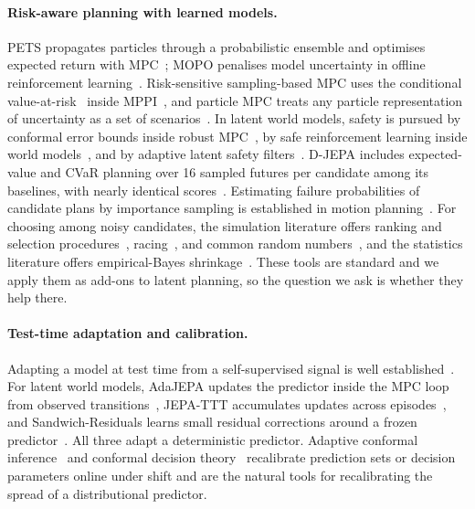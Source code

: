 \paragraph{Risk-aware planning with learned models.}
PETS propagates particles through a probabilistic ensemble and optimises expected return with MPC~\cite{chua2018pets}; MOPO penalises model uncertainty in offline reinforcement learning~\cite{yu2020mopo}. Risk-sensitive sampling-based MPC uses the conditional value-at-risk~\cite{rockafellar2000cvar} inside MPPI~\cite{yin2022ramppi,enwerem2026riskbelief}, and particle MPC treats any particle representation of uncertainty as a set of scenarios~\cite{dyro2021pmpc}. In latent world models, safety is pursued by conformal error bounds inside robust MPC~\cite{nath2026sls}, by safe reinforcement learning inside world models~\cite{huang2024safedreamer}, and by adaptive latent safety filters~\cite{cao2026worldmodelslie}. D-JEPA includes expected-value and CVaR planning over 16 sampled futures per candidate among its baselines, with nearly identical scores~\cite{liu2026djepa}. Estimating failure probabilities of candidate plans by importance sampling is established in motion planning~\cite{janson2017mcmp,schmerling2017adaptiveis}. For choosing among noisy candidates, the simulation literature offers ranking and selection procedures~\cite{kim2001fully}, racing~\cite{maron1993hoeffding}, and common random numbers~\cite{glasserman1992crn}, and the statistics literature offers empirical-Bayes shrinkage~\cite{efron1973stein}. These tools are standard and we apply them as add-ons to latent planning, so the question we ask is whether they help there.

\paragraph{Test-time adaptation and calibration.}
Adapting a model at test time from a self-supervised signal is well established~\cite{sun2020ttt,wang2021tent}. For latent world models, AdaJEPA updates the predictor inside the MPC loop from observed transitions~\cite{wang2026adajepa}, JEPA-TTT accumulates updates across episodes~\cite{zhang2026jepattt}, and Sandwich-Residuals learns small residual corrections around a frozen predictor~\cite{soni2026sandwich}. All three adapt a deterministic predictor. Adaptive conformal inference~\cite{gibbs2021aci} and conformal decision theory~\cite{lekeufack2024cdt} recalibrate prediction sets or decision parameters online under shift and are the natural tools for recalibrating the spread of a distributional predictor.

